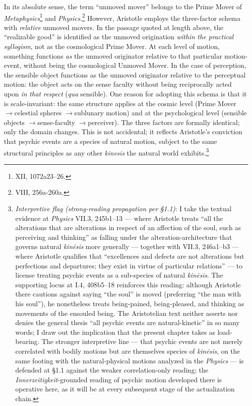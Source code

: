 \documentclass{article}
\newcommand{\ra}{\ensuremath{\rightarrow}}
\begin{document}
In its absolute sense, the term ``unmoved mover'' belongs to the Prime Mover of \textit{Metaphysics}\footnote{XII, 1072a23--26.} and \textit{Physics}.\footnote{VIII, 256a-260a.} However, Aristotle employs the three-factor schema with \textit{relative} unmoved movers. In the passage quoted at length above, the ``realizable good'' is identified as the unmoved origination \textit{within the practical syllogism}, not as the cosmological Prime Mover. At each level of motion, something functions \textit{as} the unmoved originator relative to that particular motion-event, without being the cosmological Unmoved Mover. In the case of perception, the sensible object functions as the unmoved originator relative to the perceptual motion: the object acts on the sense faculty without being reciprocally acted upon \textit{in that respect} (\textit{qua} sensible). One reason for adopting this schema is that it is scale-invariant: the same structure applies at the cosmic level (Prime Mover \ra celestial spheres \ra sublunary motion) and at the psychological level (sensible objects \ra sense-faculty \ra perceiver). The three factors are formally identical; only the domain changes. This is not accidental; it reflects Aristotle's conviction that psychic events are a species of natural motion, subject to the same structural principles as any other \textit{kinesis} the natural world exhibits.\footnote{\textit{Interpretive flag (strong-reading propagation per \S 1.1)}: I take the textual evidence at \textit{Physics} VII.3, 245b1--13 --- where Aristotle treats ``all the alterations that are alterations in respect of an affection of the soul, such as perceiving and thinking'' as falling under the alteration-architecture that governs natural \textit{kin\=esis} more generally --- together with VII.3, 246a1--b3 --- where Aristotle qualifies that ``excellences and defects are not alterations but perfections and departures; they exist in virtue of particular relations'' --- to license treating psychic events as a sub-species of natural \textit{kin\=esis}. The supporting locus at \cite{aristotle2014soul} I.4, 408b5--18 reinforces this reading: although Aristotle there cautions against saying ``the soul'' is moved (preferring ``the man with his soul''), he nonetheless treats being-pained, being-pleased, and thinking as movements of the ensouled being. The Aristotelian text neither asserts nor denies the general thesis ``all psychic events are natural-kinetic'' in so many words; I draw out the implication that the present chapter takes as load-bearing. The stronger interpretive line --- that psychic events are not merely correlated with bodily motions but are themselves species of \textit{kin\=esis}, on the same footing with the natural-physical motions analyzed in the \textit{Physics} --- is defended at \S 1.1 against the weaker correlation-only reading; the \textit{Innerzeitigkeit}-grounded reading of psychic motion developed there is operative here, as it will be at every subsequent stage of the actualization chain.}
\end{document}
